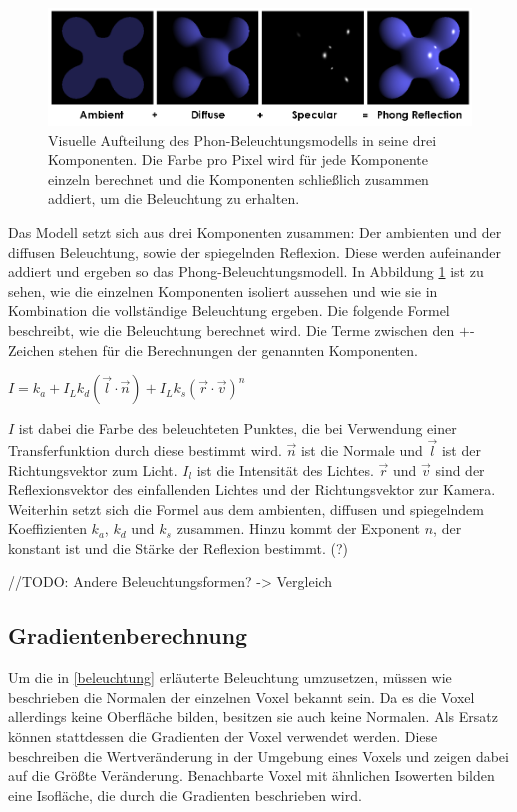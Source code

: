 \begin{figure}
	\centering
	\includegraphics[width=0.7\linewidth]{images/Phong_components_version_4.png}
	\caption{Visuelle Aufteilung des Phon-Beleuchtungsmodells in seine drei Komponenten. Die Farbe pro Pixel wird für jede Komponente einzeln berechnet und die Komponenten schließlich zusammen addiert, um die Beleuchtung zu erhalten. }
	\label{img:phong}
\end{figure}

Das Modell setzt sich aus drei Komponenten zusammen: Der ambienten und der diffusen Beleuchtung, sowie der spiegelnden Reflexion. Diese werden aufeinander addiert und ergeben so das Phong-Beleuchtungsmodell.  In Abbildung \ref{img:phong} ist zu sehen, wie die einzelnen Komponenten isoliert aussehen und wie sie in Kombination die vollständige Beleuchtung ergeben.
Die folgende Formel beschreibt, wie die Beleuchtung berechnet wird. Die Terme zwischen den $+$-Zeichen stehen für die Berechnungen der genannten Komponenten.

$I = k_{a}+I_{L}k_{d}(\vec{l}\cdot\vec{n})+I_{L}k_{s}(\vec{r}\cdot\vec{v})^n$

$I$ ist dabei die Farbe des beleuchteten Punktes, die bei Verwendung einer Transferfunktion durch diese bestimmt wird. $\vec{n}$ ist die Normale und $\vec{l}$ ist der Richtungsvektor zum Licht. $I_{l}$ ist die Intensität des Lichtes. $\vec{r}$ und $\vec{v}$ sind der Reflexionsvektor des einfallenden Lichtes und der Richtungsvektor zur Kamera. Weiterhin setzt sich die Formel aus dem ambienten, diffusen und spiegelndem Koeffizienten $k_{a}$, $k_{d}$ und $k_{s}$ zusammen. Hinzu kommt der Exponent $n$, der konstant ist und die Stärke der Reflexion bestimmt. (?)

\cite{phong75}
//TODO: Andere Beleuchtungsformen? -> Vergleich

\subsection{Gradientenberechnung}

Um die in \ref{beleuchtung} erläuterte Beleuchtung umzusetzen, müssen wie beschrieben die Normalen der einzelnen Voxel bekannt sein. Da es die Voxel allerdings keine Oberfläche bilden, besitzen sie auch keine Normalen. Als Ersatz können stattdessen die Gradienten der Voxel verwendet werden. Diese beschreiben die Wertveränderung in der Umgebung eines Voxels und zeigen dabei auf die Größte Veränderung. Benachbarte Voxel mit ähnlichen Isowerten bilden eine Isofläche, die durch die Gradienten beschrieben wird. 


